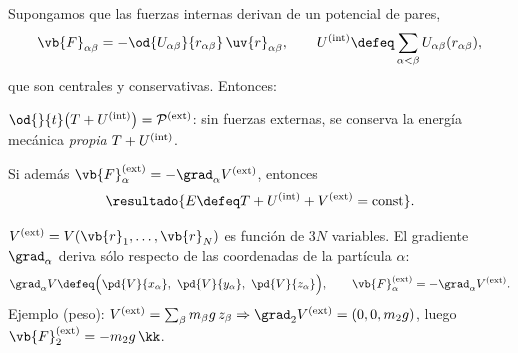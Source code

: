 \begin{teorema}
\label{teo:energia-sistema}
Supongamos que las fuerzas internas derivan de un potencial de pares,
\begin{equation}
  \vb{F}_{\alpha\beta}=-\od{U_{\alpha\beta}}{r_{\alpha\beta}}\,\uv{r}_{\alpha\beta},
  \qquad U\inn\defeq\sab U_{\alpha\beta}(r_{\alpha\beta}),
\end{equation}
que son centrales y conservativas. Entonces:
\begin{casos}
  \item $\od{}{t}\bigl(T+U\inn\bigr)=\mathcal{P}\ext$: sin fuerzas externas, se conserva
        la energía mecánica \emph{propia} $T+U^{(\mathrm{int})}$.
  \item Si además $\vb{F}_{\alpha}\ext=-\grad_{\alpha}V\ext$, entonces
        \begin{equation}
          \resultado{E\defeq T+U\inn+V\ext=\text{const}} .
        \end{equation}
\end{casos}
\end{teorema}

\begin{notacion}
$V\ext=V(\vb{r}_{1},\dots,\vb{r}_{N})$ es función de $3N$ variables. El gradiente
$\grad_{\alpha}$ deriva sólo respecto de las coordenadas de la partícula $\alpha$:
\begin{equation}
  \grad_{\alpha}V\defeq\Bigl(\pd{V}{x_{\alpha}},\ \pd{V}{y_{\alpha}},\ \pd{V}{z_{\alpha}}\Bigr),
  \qquad \vb{F}_{\alpha}\ext=-\grad_{\alpha}V\ext .
\end{equation}
Ejemplo (peso): $V\ext=\sum_{\beta}m_{\beta}g\,z_{\beta}\Rightarrow\grad_{2}V\ext=(0,0,m_{2}g)$, luego
$\vb{F}_{2}\ext=-m_{2}g\,\kk$.
\end{notacion}

